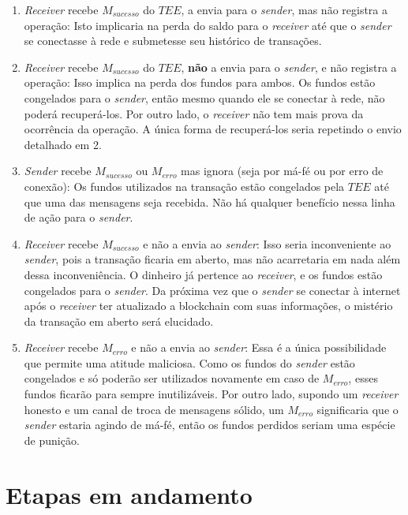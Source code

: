 \documentclass[
  12pt,
  a4paper,
  oneside,
  article,
]{abntex2}
\begin{document}
\begin{enumerate}
	\item \textit{Receiver} recebe $M_{sucesso}$ do $TEE$, a envia para o \textit{sender}, mas não registra a operação:
	      \subitem Isto implicaria na perda do saldo para o \textit{receiver} até que o \textit{sender} se conectasse à rede e submetesse seu histórico de transações.
	\item \textit{Receiver} recebe $M_{sucesso}$ do $TEE$, \textbf{não} a envia para o \textit{sender}, e não registra a operação:
	      \subitem Isso implica na perda dos fundos para ambos. Os fundos estão congelados para o \textit{sender}, então mesmo quando ele se conectar à rede, não poderá recuperá-los. Por outro lado, o \textit{receiver} não tem mais prova da ocorrência da operação. A única forma de recuperá-los seria repetindo o envio detalhado em 2.
	\item \textit{Sender} recebe $M_{sucesso}$ ou $M_{erro}$ mas ignora (seja por má-fé ou por erro de conexão):
	      \subitem Os fundos utilizados na transação estão congelados pela $TEE$ até que uma das mensagens seja recebida. Não há qualquer benefício nessa linha de ação para o \textit{sender}.

	\item \textit{Receiver} recebe $M_{sucesso}$ e não a envia ao \textit{sender}:
	      \subitem Isso seria inconveniente ao \textit{sender}, pois a transação ficaria em aberto, mas não acarretaria em nada além dessa inconveniência. O dinheiro já pertence ao \textit{receiver}, e os fundos estão congelados para o \textit{sender}. Da próxima vez que o \textit{sender} se conectar à internet após o \textit{receiver} ter atualizado a blockchain com suas informações, o mistério da transação em aberto será elucidado.

	\item \textit{Receiver} recebe $M_{erro}$ e não a envia ao \textit{sender}:
	      \subitem Essa é a única possibilidade que permite uma atitude maliciosa. Como os fundos do \textit{sender} estão congelados e só poderão ser utilizados novamente em caso de $M_{erro}$, esses fundos ficarão para sempre inutilizáveis. Por outro lado, supondo um \textit{receiver} honesto e um canal de troca de mensagens sólido, um $M_{erro}$ significaria que o \textit{sender} estaria agindo de má-fé, então os fundos perdidos seriam uma espécie de punição.
\end{enumerate}


%
\section{Etapas em andamento}
\end{document}
